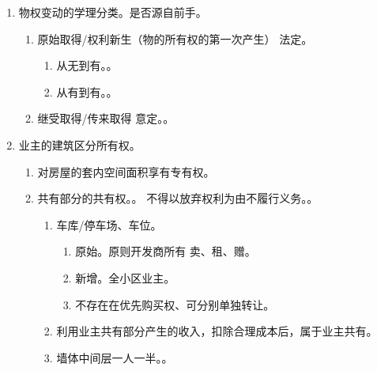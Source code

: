 \begin{enumerate}
\begin{enumerate}
\begin{enumerate}
\begin{enumerate}
                          \item 混合。。
                          \item 加工。加工后价值大于/小于原物 \yjt 归加工人/原主 \yjt 给原主/加工人补偿。。
                        \end{enumerate}
                \end{enumerate}
        \end{enumerate}
  \item 物权变动的学理分类。是否源自前手。
        \begin{enumerate}
          \item 原始取得/权利新生（物的所有权的第一次产生） \yjt 法定。
                \begin{enumerate}
                  \item 从无到有。。
                  \item 从有到有。。
                \end{enumerate}
          \item 继受取得/传来取得 \yjt 意定。。
        \end{enumerate}
  \item 业主的建筑区分所有权。
        \begin{enumerate}
          \item 对房屋的套内空间面积享有专有权。
          \item 共有部分的共有权。。
                不得以放弃权利为由不履行义务。。
                \begin{enumerate}
                  \item 车库/停车场、车位。
                        \begin{enumerate}
                          \item 原始。原则开发商所有 \yjt 卖、租、赠。
                          \item 新增。全小区业主。
                          \item 不存在在优先购买权、可分别单独转让。
                        \end{enumerate}
                  \item 利用业主共有部分产生的收入，扣除合理成本后，属于业主共有。
                  \item 墙体中间层一人一半。。
                \end{enumerate}

\end{enumerate}
\end{enumerate}

